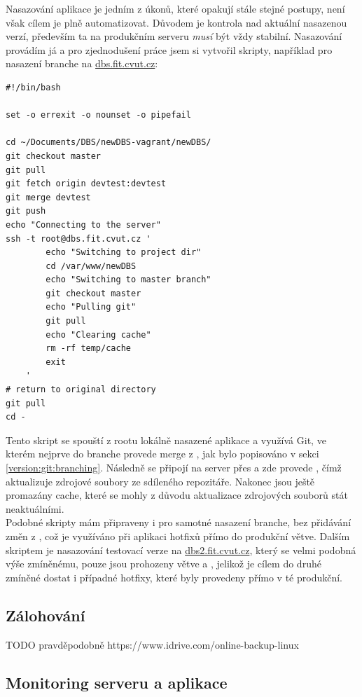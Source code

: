 Nasazování aplikace je jedním z úkonů, které opakují stále stejné postupy, není však cílem je plně automatizovat. Důvodem je kontrola nad aktuální nasazenou verzí, především ta na produkčním serveru \emph{musí} být vždy stabilní. Nasazování provádím já a pro zjednodušení práce jsem si vytvořil skripty, například pro nasazení  branche na \url{dbs.fit.cvut.cz}:
\begin{verbatim}
#!/bin/bash

set -o errexit -o nounset -o pipefail

cd ~/Documents/DBS/newDBS-vagrant/newDBS/
git checkout master
git pull
git fetch origin devtest:devtest
git merge devtest
git push
echo "Connecting to the server"
ssh -t root@dbs.fit.cvut.cz '
        echo "Switching to project dir"
        cd /var/www/newDBS
        echo "Switching to master branch"
        git checkout master
        echo "Pulling git"
        git pull
        echo "Clearing cache"
        rm -rf temp/cache
        exit
    '
# return to original directory
git pull
cd -
\end{verbatim}
Tento skript se spouští z rootu lokálně nasazené aplikace a využívá Git, ve kterém nejprve do  branche provede merge z , jak bylo popisováno v sekci \ref{version:git:branching}. Následně se připojí na server přes  a zde provede , čímž aktualizuje zdrojové soubory ze sdíleného repozitáře. Nakonec jsou ještě promazány cache, které se mohly z důvodu aktualizace zdrojových souborů stát neaktuálními.\\
Podobné skripty mám připraveny i pro samotné nasazení  branche, bez přidávání změn z , což je využíváno při aplikaci hotfixů přímo do produkční větve. Dalším skriptem je nasazování testovací verze na \url{dbs2.fit.cvut.cz}, který se velmi podobná výše zmíněnému, pouze jsou prohozeny větve  a , jelikož je cílem do druhé zmíněné dostat i případné hotfixy, které byly provedeny přímo v té produkční.

\subsection{Zálohování}

TODO pravděpodobně https://www.idrive.com/online-backup-linux

\subsection{Monitoring serveru a aplikace}

